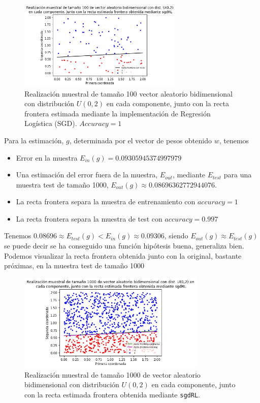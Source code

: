 \documentclass[11pt,a4paper]{article}
\theoremstyle{definition}
\begin{document}
	\begin{figure}[H]
		\centering
		\includegraphics[width=0.7\textwidth]{images/rl2}
		\caption{Realización muestral de tamaño 100 vector aleatorio bidimensional con distribución $U(0,2)$ en cada componente, junto con la recta frontera estimada mediante la implementación de Regresión Logística (SGD). $Accuracy = 1$}
	\end{figure}
	Para la estimación, $g$, determinada por el vector de pesos obtenido $w$, tenemos
	\begin{itemize} 
		\item Error en la muestra $E_{in}(g)=0.09305945374997979$
		\item Una estimación del error fuera de la muestra, $E_{out}$, mediante $E_{test}$ para una muestra test de tamaño 1000, $E_{out}(g)\approx 0.08696362772944076$.
		\item La recta frontera separa la muestra de entrenamiento con $accuracy = 1$
		\item La recta frontera separa la muestra de test con $accuracy = 0.997$
	\end{itemize}
	Tenemos $0.08696\approx E_{test}(g)<E_{in}(g)\approx 0.09306$, siendo $E_{out}(g)\approx E_{test}(g)$ se puede decir se ha conseguido una función hipótesis buena, generaliza bien.\\
	Podemos visualizar la recta frontera obtenida junto con la original, bastante próximas, en la muestra test de tamaño 1000
	\begin{figure}[H]
		\centering
		\includegraphics[width=0.8\textwidth]{images/rl_test}
		\caption{Realización muestral de tamaño 1000 de vector aleatorio bidimensional con distribución $U(0,2)$ en cada componente, junto con la recta estimada frontera obtenida mediante \texttt{sgdRL}.}
	\end{figure}
	
\end{document}
